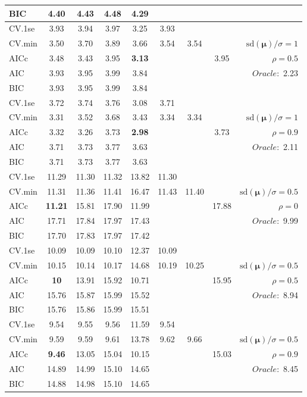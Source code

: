\begin{table}
\begin{center}
\begin{tabular}{l*{7}{c}|r}
BIC & 4.40 & 4.43 & 4.48 & 4.29 & & & &  \\
 \hline 
CV.1se & 3.93 & 3.94 & 3.97 & 3.25 & 3.93 & & & \\
CV.min & 3.50 & 3.70 & 3.89 & 3.66 & 3.54 & 3.54 & & $\mathrm{sd}(\mathbf{\mu})/\sigma=1$ \\
AICc & 3.48 & 3.43 & 3.95 & {\bf 3.13} & & & 3.95 &  $\rho=0.5$ \\
AIC & 3.93 & 3.95 & 3.99 & 3.84 & & & &  \multirow{2}{*}{$Oracle: $ 2.23} \\
BIC & 3.93 & 3.95 & 3.99 & 3.84 & & & &  \\
 \hline 
CV.1se & 3.72 & 3.74 & 3.76 & 3.08 & 3.71 & & & \\
CV.min & 3.31 & 3.52 & 3.68 & 3.43 & 3.34 & 3.34 & & $\mathrm{sd}(\mathbf{\mu})/\sigma=1$ \\
AICc & 3.32 & 3.26 & 3.73 & {\bf 2.98} & & & 3.73 &  $\rho=0.9$ \\
AIC & 3.71 & 3.73 & 3.77 & 3.63 & & & &  \multirow{2}{*}{$Oracle: $ 2.11} \\
BIC & 3.71 & 3.73 & 3.77 & 3.63 & & & &  \\
 \hline 
CV.1se & 11.29 & 11.30 & 11.32 & 13.82 & 11.30 & & & \\
CV.min & 11.31 & 11.36 & 11.41 & 16.47 & 11.43 & 11.40 & & $\mathrm{sd}(\mathbf{\mu})/\sigma=0.5$ \\
AICc & {\bf 11.21} & 15.81 & 17.90 & 11.99 & & & 17.88 &  $\rho=0$ \\
AIC & 17.71 & 17.84 & 17.97 & 17.43 & & & &  \multirow{2}{*}{$Oracle: $ 9.99} \\
BIC & 17.70 & 17.83 & 17.97 & 17.42 & & & &  \\
 \hline 
CV.1se & 10.09 & 10.09 & 10.10 & 12.37 & 10.09 & & & \\
CV.min & 10.15 & 10.14 & 10.17 & 14.68 & 10.19 & 10.25 & & $\mathrm{sd}(\mathbf{\mu})/\sigma=0.5$ \\
AICc & {\bf 10} & 13.91 & 15.92 & 10.71 & & & 15.95 &  $\rho=0.5$ \\
AIC & 15.76 & 15.87 & 15.99 & 15.52 & & & &  \multirow{2}{*}{$Oracle: $ 8.94} \\
BIC & 15.76 & 15.86 & 15.99 & 15.51 & & & &  \\
 \hline 
CV.1se & 9.54 & 9.55 & 9.56 & 11.59 & 9.54 & & & \\
CV.min & 9.59 & 9.59 & 9.61 & 13.78 & 9.62 & 9.66 & & $\mathrm{sd}(\mathbf{\mu})/\sigma=0.5$ \\
AICc & {\bf 9.46} & 13.05 & 15.04 & 10.15 & & & 15.03 &  $\rho=0.9$ \\
AIC & 14.89 & 14.99 & 15.10 & 14.65 & & & &  \multirow{2}{*}{$Oracle: $ 8.45} \\
BIC & 14.88 & 14.98 & 15.10 & 14.65 & & & &  \\
 \hline 
\end{tabular}
\end{center}
\vspace{-1cm}
\end{table}




